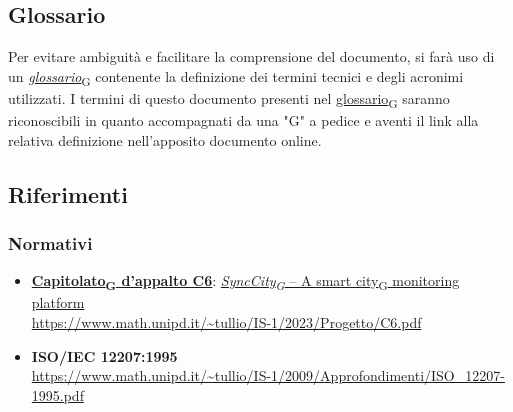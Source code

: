 \subsection{Glossario}
Per evitare ambiguità e facilitare la comprensione del documento, si farà uso di un \href{https://7last.github.io/docs/rtb/documentazione-interna/glossario\#glossario}{\textit{glossario}\textsubscript{G}} contenente la definizione dei termini tecnici e degli acronimi utilizzati. I termini di questo documento presenti nel \href{https://7last.github.io/docs/rtb/documentazione-interna/glossario\#glossario}{glossario\textsubscript{G}} saranno riconoscibili in quanto accompagnati da una "G" a pedice e aventi il link alla relativa definizione nell'apposito documento online.

\subsection{Riferimenti}
\subsubsection{Normativi}
\begin{itemize}
	\item \href{https://7last.github.io/docs/rtb/documentazione-interna/glossario\#capitolato}{\textbf{Capitolato\textsubscript{G} d'appalto C6}}: \href{https://7last.github.io/docs/rtb/documentazione-interna/glossario\#synccity}{\textit{SyncCity\textsubscript{G} } – A \href{https://7last.github.io/docs/rtb/documentazione-interna/glossario\#smart-city}{smart city\textsubscript{G}} monitoring platform}\\
    \url{https://www.math.unipd.it/~tullio/IS-1/2023/Progetto/C6.pdf}
	\item \textbf{ISO/IEC 12207:1995} \\ \url{https://www.math.unipd.it/~tullio/IS-1/2009/Approfondimenti/ISO_12207-1995.pdf}
\end{itemize}

